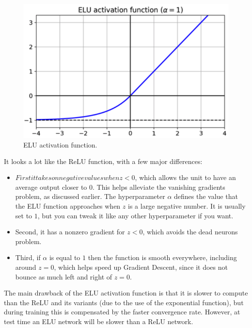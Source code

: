 \documentclass[12pt, letterpaper]{article}
\theoremstyle{definition}
\begin{document}
\begin{figure}
\centering
\includegraphics[scale=0.4]{img/ELU}
\caption{ELU activation function.}
\end{figure}
It looks a lot like the ReLU function, with a few major differences:
\begin{itemize}
\item$ First it takes on negative values when z < 0$, which allows the unit to have an average output closer to $0$. This helps alleviate the vanishing gradients problem, as discussed earlier. The hyperparameter $\alpha$ defines the value that the ELU function approaches when $z$ is a large negative number. It is usually set to $1$, but you can tweak it like any other hyperparameter if you want.
\item Second, it has a nonzero gradient for $z < 0$, which avoids the dead neurons problem.
\item Third, if $\alpha$ is equal to $1$ then the function is smooth everywhere, including around $z = 0$, which helps speed up Gradient Descent, since it does not bounce as much left and right of $z = 0$.
\end{itemize}
The main drawback of the ELU activation function is that it is slower to compute than the ReLU and its variants (due to the use of the exponential function), but during training this is compensated by the faster convergence rate. However, at test time an ELU network will be slower than a ReLU network.
\end{document}
